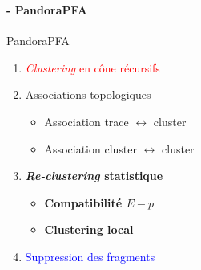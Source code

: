 \documentclass[8pt]{beamer}
\begin{document}
  \begingroup
  \footnotesize
  \begin{frame}
  \frametitle{\secname}
  \framesubtitle{\subsecname - PandoraPFA}
    \begin{minipage}{0.6\linewidth}
    \begin{block}{PandoraPFA}
      \begin{enumerate}
        \item<2-> \textcolor{red}{\textit{Clustering} en cône récursifs}
        \item<3-> \textcolor{MyGreen}{Associations topologiques}
        \begin{itemize}
          \item<3-> \textcolor{MyGreen}{\footnotesize Association trace $\leftrightarrow$ cluster}
          \item<3-> \textcolor{MyGreen}{\footnotesize Association cluster $\leftrightarrow$ cluster}
        \end{itemize}
        \item<4->  \textbf{\textit{Re-clustering} statistique}
        \begin{itemize}
          \item<4-> \textbf{\footnotesize Compatibilité $E-p$}
          \item<4-> \textbf{\footnotesize Clustering local}
        \end{itemize}
        \item<5-> \textcolor{blue}{Suppression des fragments}
      \end{enumerate}
    \end{block}
    ~
    \end{minipage} \hfill
    \begin{minipage}{0.39\linewidth}
      \begin{center}
\end{center}
\end{minipage}
\end{frame}
\end{document}
